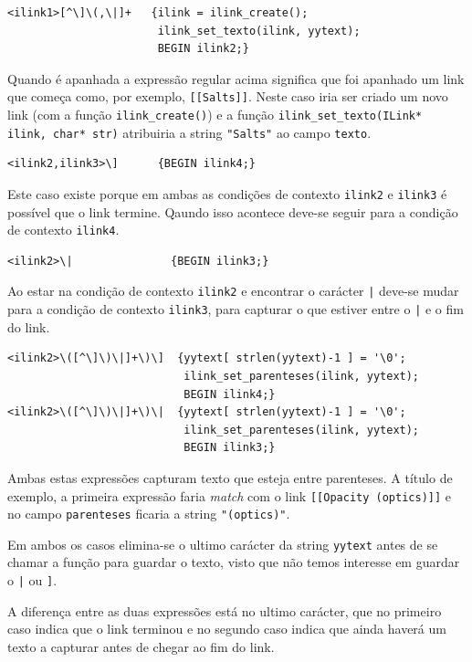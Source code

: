\documentclass[11pt, a4paper, oneside]{article}
\begin{document}
\begin{verbatim}
<ilink1>[^\]\(,\|]+   {ilink = ilink_create();
                       ilink_set_texto(ilink, yytext);
                       BEGIN ilink2;}
\end{verbatim}

Quando é apanhada a expressão regular acima significa que foi apanhado um link que começa como, por exemplo, \texttt{[[Salts]]}. Neste caso iria ser criado um novo link (com a função \texttt{ilink\_create()}) e a função \texttt{ilink\_set\_texto(ILink* ilink, char* str)} atribuiria a string \texttt{"Salts"} ao campo \texttt{texto}.


\begin{verbatim}
<ilink2,ilink3>\]      {BEGIN ilink4;}
\end{verbatim}

Este caso existe porque em ambas as condições de contexto \texttt{ilink2} e \texttt{ilink3} é possível que o link termine. Qaundo isso acontece deve-se seguir para a condição de contexto \texttt{ilink4}.

\begin{verbatim}
<ilink2>\|               {BEGIN ilink3;}
\end{verbatim}

Ao estar na condição de contexto \texttt{ilink2} e encontrar o carácter \texttt{|} deve-se mudar para a condição de contexto \texttt{ilink3}, para capturar o que estiver entre o \texttt{|} e o fim do link.

\begin{verbatim}
<ilink2>\([^\]\)\|]+\)\]  {yytext[ strlen(yytext)-1 ] = '\0';
                           ilink_set_parenteses(ilink, yytext);
                           BEGIN ilink4;}
<ilink2>\([^\]\)\|]+\)\|  {yytext[ strlen(yytext)-1 ] = '\0';
                           ilink_set_parenteses(ilink, yytext);
                           BEGIN ilink3;}
\end{verbatim}

Ambas estas expressões capturam texto que esteja entre parenteses. A título de exemplo, a primeira expressão faria \emph{match} com o link \texttt{[[Opacity (optics)]]} e no campo \texttt{parenteses} ficaria a string \texttt{"(optics)"}.

Em ambos os casos elimina-se o ultimo carácter da string \texttt{yytext} antes de se chamar a função para guardar o texto, visto que não temos interesse em guardar o \texttt{|} ou \texttt{]}.

A diferença entre as duas expressões está no ultimo carácter, que no primeiro caso indica que o link terminou e no segundo caso indica que ainda haverá um texto a capturar antes de chegar ao fim do link.
\end{document}
